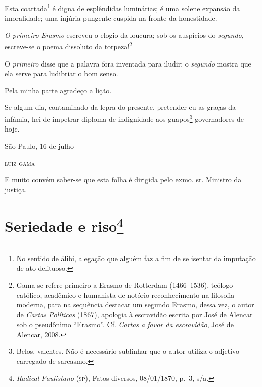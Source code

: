 Esta coartada\footnote{ No sentido de álibi, alegação que alguém faz a
  fim de se isentar da imputação de ato delituoso.} é digna de
esplêndidas luminárias; é uma solene expansão da imoralidade; uma
injúria pungente cuspida na fronte da honestidade.

\emph{O primeiro Erasmo} escreveu o elogio da loucura; sob os
auspícios do \emph{segundo}, escreve-se o poema dissoluto da
torpeza!\footnote{ Gama se refere primeiro a Erasmo de Rotterdam
  (1466--1536), teólogo católico, acadêmico e humanista de notório
  reconhecimento na filosofia moderna, para na sequência destacar um
  segundo Erasmo, dessa vez, o autor de \emph{Cartas Políticas} (1867),
  apologia à escravidão escrita por José de Alencar sob o pseudônimo
  ``Erasmo''. Cf. \emph{Cartas a favor da escravidão}, José de Alencar,
  2008.}

O \emph{primeiro} disse que a palavra fora inventada para iludir; o
\emph{segundo} mostra que ela serve para ludibriar o bom senso.

Pela minha parte agradeço a lição.

Se algum dia, contaminado da lepra do presente, pretender eu as graças
da infâmia, hei de impetrar diploma de indignidade aos guapos\footnote{
  Belos, valentes. Não é necessário sublinhar que o autor utiliza o
  adjetivo carregado de sarcasmo.} governadores de hoje.

\begin{flushright}
São Paulo, 16 de julho

\textsc{luiz gama}
\end{flushright}

\asterisc{}

E muito convém saber-se que esta folha é dirigida pelo exmo. sr.
Ministro da justiça.

\chapter{Seriedade e riso\footnote{\emph{Radical Paulistano} (\textsc{sp}), Fatos diversos,
  08/01/1870, p.~3, s/a.}} %

